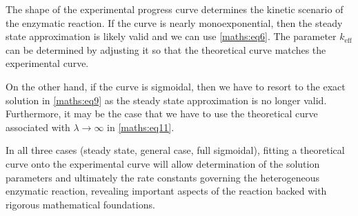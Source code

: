 \documentclass{article}
\begin{document}
The shape of the experimental progress curve determines the kinetic scenario of the enzymatic reaction. If the curve is nearly monoexponential, then the steady state approximation is likely valid and we can use \eqref{maths:eq6}. The parameter $k_{\text{eff}}$ can be determined by adjusting it so that the theoretical curve matches the experimental curve. 

On the other hand, if the curve is sigmoidal, then we have to resort to the exact solution in \eqref{maths:eq9} as the steady state approximation is no longer valid. Furthermore, it may be the case that we have to use the theoretical curve associated with $\lambda \to \infty$ in \eqref{maths:eq11}. 

In all three cases (steady state, general case, full sigmoidal), fitting a theoretical curve onto the experimental curve will allow determination of the solution parameters and ultimately the rate constants governing the heterogeneous enzymatic reaction, revealing important aspects of the reaction backed with rigorous mathematical foundations.

\nocite{*}


\end{document}
